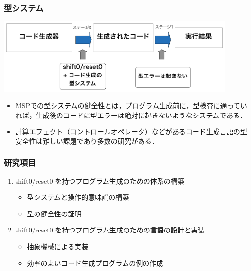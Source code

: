 \documentclass[dvipdfmx,cjk,xcolor=dvipsnames,envcountsect,notheorems,12pt,handout]{beamer} \usepackage{pgfpages} \pgfpagesuselayout{4 on 1}[a4paper,landscape,border shrink=5mm]
\theoremstyle{definition}
\begin{document}


\begin{frame}
  \frametitle{型システム}

  \includegraphics[clip,width=12cm]{./img/type_system1.png}


  \begin{itemize}
  \item MSPでの型システムの健全性とは，プログラム生成前に，型検査に通っていれば，生成後のコードに型エラーは絶対に起きないようなシステムである．
  \item 計算エフェクト（コントロールオペレータ）などがあるコード生成言語の型安全性は難しい課題であり多数の研究がある．
  \end{itemize}


\end{frame}


\begin{frame}[fragile]
  \frametitle{研究項目}
\begin{enumerate}
\item shift0/reset0 を持つプログラム生成のための体系の構築
  \begin{itemize}
  \item 型システムと操作的意味論の構築
  \item 型の健全性の証明
  \end{itemize}
\item shift0/reset0 を持つプログラム生成のための言語の設計と実装
  \begin{itemize}
  \item 抽象機械による実装
  \item 効率のよいコード生成プログラムの例の作成
  \end{itemize}
\end{enumerate}

\end{frame}
\end{document}
